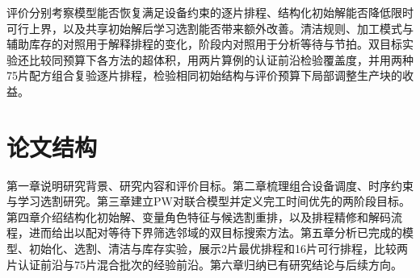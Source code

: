 评价分别考察模型能否恢复满足设备约束的逐片排程、结构化初始解能否降低限时可行上界，以及共享初始解后学习选割能否带来额外改善。清洁规则、加工模式与辅助库存的对照用于解释排程的变化，阶段内对照用于分析等待与节拍。双目标实验还比较同预算下各方法的超体积，用两片算例的认证前沿检验覆盖度，并用两种75片配方组合复验逐片排程，检验相同初始结构与评价预算下局部调整生产块的收益。
\section{论文结构}
第一章说明研究背景、研究内容和评价目标。第二章梳理组合设备调度、时序约束与学习选割研究。第三章建立PW对联合模型并定义完工时间优先的两阶段目标。第四章介绍结构化初始解、变量角色特征与候选割重排，以及排程精修和解码流程，进而给出以配对等待下界筛选邻域的双目标搜索方法。第五章分析已完成的模型、初始化、选割、清洁与库存实验，展示2片最优排程和16片可行排程，比较两片认证前沿与75片混合批次的经验前沿。第六章归纳已有研究结论与后续方向。
